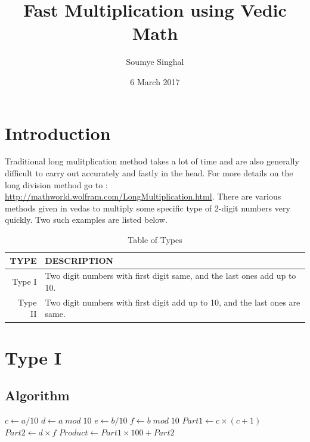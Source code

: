 \documentclass{article}
\title{Fast Multiplication using Vedic Math}
\author{Soumye Singhal}
\date{6 March 2017}
\begin{document}
\maketitle
\tableofcontents
\newpage

\section{Introduction}
Traditional long mulitplication method \cite{google} takes a lot of time and are also generally difficult to carry out accurately and fastly in the head. For more details on the long division method go to : \url{http://mathworld.wolfram.com/LongMultiplication.html}. There are various methods given in vedas to multiply some specific type of 2-digit numbers very quickly. Two such examples are listed below. \cite{vedas} \cite{vedic}

\begin{table}[h]
	\begin{center}
		\begin{tabular}{|r | l|}
			\hline
			\textbf{TYPE} & \textbf{DESCRIPTION} \\
			\hline
			Type I & Two digit numbers with first digit same, and the last ones add up to 10. \\
			\hline
			Type II & Two digit numbers with first digit add up to 10, and the last ones are same. \\
			\hline
		\end{tabular}
		\caption{Table of Types}
	\end{center}
\end{table}

\section{Type I}
\subsection{Algorithm}
\label{Type I:algorithm}
	\begin{algorithm}
		\begin{algorithmic}
				\State $c \gets a/10$ 	
				\State $d \gets a \; mod \; 10$ 	
				\State $e \gets b/10$ 
				\State $f \gets b \; mod \; 10$ 	
					\State $Part1 \gets c \times (c+1)$
					\State $Part2 \gets d \times f$
					\State $Product \gets Part1 \times 100 + Part2$ 
				\Else
				\EndIf
			\EndProcedure
		\end{algorithmic}
	\end{algorithm}
\end{document}
